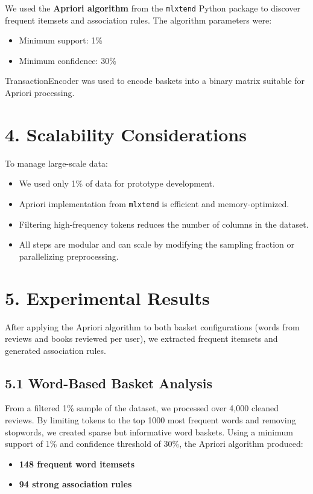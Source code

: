 \documentclass{article}
\begin{document}
We used the \textbf{Apriori algorithm} from the \texttt{mlxtend} Python package to discover frequent itemsets and association rules. The algorithm parameters were:
\begin{itemize}
    \item Minimum support: 1\%
    \item Minimum confidence: 30\%
\end{itemize}

TransactionEncoder was used to encode baskets into a binary matrix suitable for Apriori processing.

\section*{4. Scalability Considerations}

To manage large-scale data:
\begin{itemize}
    \item We used only 1\% of data for prototype development.
    \item Apriori implementation from \texttt{mlxtend} is efficient and memory-optimized.
    \item Filtering high-frequency tokens reduces the number of columns in the dataset.
    \item All steps are modular and can scale by modifying the sampling fraction or parallelizing preprocessing.
\end{itemize}

\section*{5. Experimental Results}

After applying the Apriori algorithm to both basket configurations (words from reviews and books reviewed per user), we extracted frequent itemsets and generated association rules.

\subsection*{5.1 Word-Based Basket Analysis}
From a filtered 1\% sample of the dataset, we processed over 4,000 cleaned reviews. By limiting tokens to the top 1000 most frequent words and removing stopwords, we created sparse but informative word baskets. Using a minimum support of 1\% and confidence threshold of 30\%, the Apriori algorithm produced:

\begin{itemize}
    \item \textbf{148 frequent word itemsets}
    \item \textbf{94 strong association rules}
\end{itemize}
\end{document}
